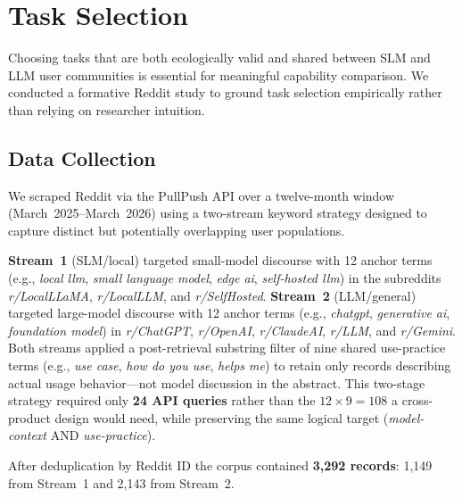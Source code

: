 \section{Task Selection}
\label{sec:tasksel}

Choosing tasks that are both ecologically valid and shared between SLM and LLM
user communities is essential for meaningful capability comparison.
We conducted a formative Reddit study to ground task selection empirically
rather than relying on researcher intuition.

\subsection{Data Collection}

We scraped Reddit via the PullPush API over a twelve-month window
(March~2025--March~2026) using a two-stream keyword strategy designed to
capture distinct but potentially overlapping user populations.

\textbf{Stream~1} (SLM/local) targeted small-model discourse with 12 anchor
terms (e.g., \textit{local llm}, \textit{small language model},
\textit{edge ai}, \textit{self-hosted llm}) in the subreddits
\textit{r/LocalLLaMA}, \textit{r/LocalLLM}, and \textit{r/SelfHosted}.
\textbf{Stream~2} (LLM/general) targeted large-model discourse with 12 anchor
terms (e.g., \textit{chatgpt}, \textit{generative ai},
\textit{foundation model}) in \textit{r/ChatGPT}, \textit{r/OpenAI},
\textit{r/ClaudeAI}, \textit{r/LLM}, and \textit{r/Gemini}.
Both streams applied a post-retrieval substring filter of nine shared
use-practice terms (e.g., \textit{use case}, \textit{how do you use},
\textit{helps me}) to retain only records describing actual usage
behavior---not model discussion in the abstract.
This two-stage strategy required only \textbf{24 API queries} rather than the
$12 \times 9 = 108$ a cross-product design would need, while preserving the
same logical target (\textit{model-context} AND \textit{use-practice}).

After deduplication by Reddit ID the corpus contained
\textbf{3,292 records}: 1,149 from Stream~1 and 2,143 from Stream~2.

